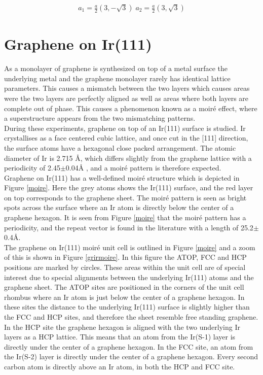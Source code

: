 \begin{align*}
  a_1 = \frac{a}{2}(3,-\sqrt{3}) \; a_2 = \frac{a}{2}(3,\sqrt{3})
\end{align*}



\section{Graphene on Ir(111)}

As a monolayer of graphene is synthesized on top of a metal surface the underlying metal and the graphene monolayer rarely has identical lattice parameters. This causes a mismatch between the two layers which causes areas were the two layers are perfectly aligned as well as areas where both layers are complete out of phase. This causes a phenomenon known as a moiré effect, where a superstructure appears from the two mismatching patterns.\\
During these experiments, graphene on top of an Ir(111) surface is studied. Ir crystallises as a face centered cubic lattice, and once cut in the [111] direction, the surface atoms have a hexagonal close packed arrangement.\cite{kibler2003preparation} The atomic diameter of Ir is 2.715 Å\cite{kibler2003preparation}, which differs slightly from the graphene lattice with a periodicity of 2.45$\pm$0.04Å \cite{1367-2630-10-4-043033}, and a moiré pattern is therefore expected.\\
Graphene on Ir(111) has a well-defined moiré structure which is depicted in Figure \ref{moire}. Here the grey atoms shows the Ir(111) surface, and the red layer on top corresponds to the graphene sheet. The moiré pattern is seen as bright spots across the surface where an Ir atom is directly below the center of a graphene hexagon. It is seen from Figure \ref{moire} that the moiré pattern has a periodicity, and the repeat vector is found in the literature with a length of 25.2$\pm$0.4Å.\cite{1367-2630-10-4-043033}\\
The graphene on Ir(111) moiré unit cell is outlined in Figure \ref{moire} and a zoom of this is shown in Figure \ref{grirmoire}. In this figure the ATOP, FCC and HCP positions are marked by circles. These areas within the unit cell are of special interest due to special alignments between the underlying Ir(111) atoms and the graphene sheet. The ATOP sites are positioned in the corners of the unit cell rhombus where an Ir atom is just below the center of a graphene hexagon. In these sites the distance to the underlying Ir(111) surface is slightly higher than the FCC and HCP sites, and therefore the sheet resemble free standing graphene.\cite{PhysRevB.93.115403} In the HCP site the graphene hexagon is aligned with the two underlying Ir layers as a HCP lattice. This means that an atom from the Ir(S-1) layer is directly under the center of a graphene hexagon. In the FCC site, an atom from the Ir(S-2) layer is directly under the center of a graphene hexagon. Every second carbon atom is directly above an Ir atom, in both the HCP and FCC site.\cite{voloshina2013electronic}

